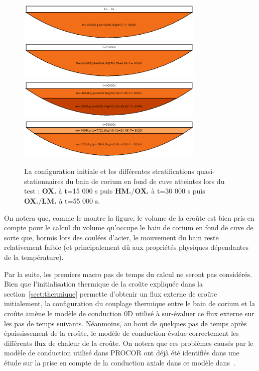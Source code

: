 \begin{figure}
\centering
\includegraphics[width=0.8\textwidth, keepaspectratio=true]{Figures/coriumPool_t=00000.png}\\
\includegraphics[width=0.8\textwidth, keepaspectratio=true]{Figures/coriumPool_t=15000.png}\\
\includegraphics[width=0.8\textwidth, keepaspectratio=true]{Figures/coriumPool_t=30000.png}\\
\includegraphics[width=0.8\textwidth, keepaspectratio=true]{Figures/coriumPool_t=55000.png}
\caption{La configuration initiale et les différentes stratifications quasi-stationnaires du bain de corium en fond de cuve atteintes lors du test : \textcolor{orange!75!black}{\textbf{OX.}} à t=15 000 s puis \textcolor{red!50!black}{\textbf{HM.}}/\textcolor{orange!75!black}{\textbf{OX.}} à t=30 000 s puis \textcolor{orange!75!black}{\textbf{OX.}}/\textcolor{orange!50!white}{\textbf{LM.}} à t=55 000 s.}
\label{fig:stratification_bains}
\end{figure}
On notera que, comme le montre la figure, le volume de la croûte est bien pris en compte pour le calcul du volume qu'occupe le bain de corium en fond de cuve de sorte que, hormis lors des coulées d'acier, le mouvement du bain reste relativement faible (et principalement dû aux propriétés physiques dépendantes de la température).

Par la suite, les premiers macro pas de temps du calcul ne seront pas considérés. Bien que l'initialisation thermique de la croûte expliquée dans la section~\ref{sect:thermique} permette d'obtenir un flux externe de croûte initialement, la configuration du couplage thermique entre le bain de corium et la croûte amène le modèle de conduction 0D utilisé à sur-évaluer ce flux externe sur les pas de temps suivants. Néanmoins, au bout de quelques pas de temps après épaississement de la croûte, le modèle de conduction évalue correctement les différents flux de chaleur de la croûte. On notera que ces problèmes causés par le modèle de conduction utilisé dans PROCOR ont déjà été identifiés dans une étude sur la prise en compte de la conduction axiale dans ce modèle dans~\cite{Peybernes2018}.

